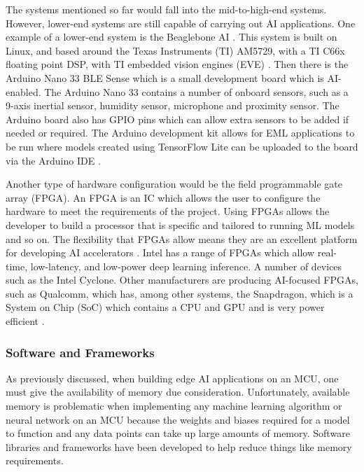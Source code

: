 \documentclass[conference]{IEEEtran}
\begin{document}
The systems mentioned so far would fall into the mid-to-high-end systems. However, lower-end systems are still capable of carrying out AI applications. One example of a lower-end system is the Beaglebone AI \cite{b8}. This system is built on Linux, and based around the Texas Instruments (TI) AM5729, with a TI C66x floating point DSP, with TI embedded vision engines (EVE) \cite{b9}. Then there is the Arduino Nano 33 BLE Sense which is a small development board which is AI-enabled. The Arduino Nano 33 contains a number of onboard sensors, such as a 9-axis inertial sensor, humidity sensor, microphone and proximity sensor. The Arduino board also has GPIO pins which can allow extra sensors to be added if needed or required. The Arduino development kit allows for EML applications to be run where models created using TensorFlow Lite can be uploaded to the board via the Arduino IDE \cite{b10}.

Another type of hardware configuration would be the field programmable gate array (FPGA). An FPGA is an IC which allows the user to configure the hardware to meet the requirements of the project. Using FPGAs allows the developer to build a processor that is specific and tailored to running ML models and so on. The flexibility that FPGAs allow means they are an excellent platform for developing AI accelerators \cite{b9}. Intel has a range of FPGAs which allow real-time, low-latency, and low-power deep learning inference. A number of devices such as the Intel Cyclone. Other manufacturers are producing AI-focused FPGAs, such as Qualcomm, which has, among other systems, the Snapdragon, which is a System on Chip (SoC) which contains a CPU and GPU and is very power efficient \cite{b11}. 

\subsubsection{Software and Frameworks}
As previously discussed, when building edge AI applications on an MCU, one must give the availability of memory due consideration. Unfortunately, available memory is problematic when implementing any machine learning algorithm or neural network on an MCU because the weights and biases required for a model to function and any data points can take up large amounts of memory. Software libraries and frameworks have been developed to help reduce things like memory requirements.
\end{document}
